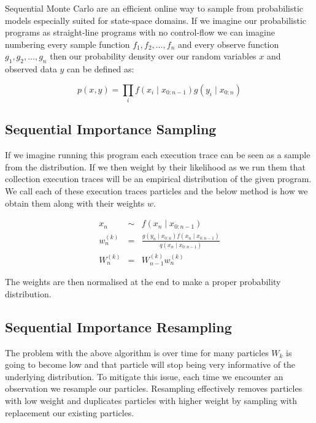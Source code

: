 \documentclass[
]{ceurart}
\begin{document}
Sequential Monte Carlo\cite{chopin2020introduction} are an efficient
online way to sample from probabilistic models especially suited for
state-space domains. If we imagine our probabilistic programs as
straight-line programs with no control-flow we can imagine numbering
every sample function $f_1, f_2, \ldots, f_n$ and every observe
function $g_1, g_2, \ldots, g_n$ then our probability density over our
random variables $x$ and observed data $y$ can be defined as:

\begin{equation}
  p(x, y) = \prod_i f(x_i \mid x_{0:n-1})g(y_i \mid x_{0:n})
\end{equation}

\subsection{Sequential Importance Sampling}

If we imagine running this program each execution trace can be seen as
a sample from the distribution. If we then weight by their likelihood
as we run them that collection execution traces will be an empirical
distribution of the given program. We call each of these execution traces
particles and the below method is how we obtain them along with their weights $w$.

\begin{eqnarray}
  x_n &\sim& f(x_n \mid x_{0:n-1}) \\
  w_n^{(k)} &=& \frac{g(y_n \mid x_{0:n})f(x_n \mid x_{0:n-1})}{q(x_n \mid x_{0:n-1})} \\
  W_n^{(k)} &=& W_{n-1}^{(k)} w_n^{(k)}
\end{eqnarray}

The weights are then normalised at the end to make a proper probability distribution.

\subsection{Sequential Importance Resampling}

The problem with the above algorithm is over time for many particles
$W_k$ is going to become low and that particle will stop being very
informative of the underlying distribution. To mitigate this issue,
each time we encounter an observation we resample our particles. Resampling
effectively removes particles with low weight and duplicates particles
with higher weight by sampling with replacement our existing particles.
\end{document}
